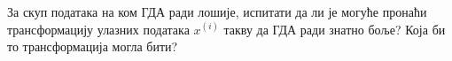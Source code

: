 \item {} За скуп података на ком ГДА ради лошије, испитати да ли је могуће пронаћи трансформацију улазних података $x^{(i)}$ такву да ГДА ради знатно боље? Која би то трансформација могла бити?

